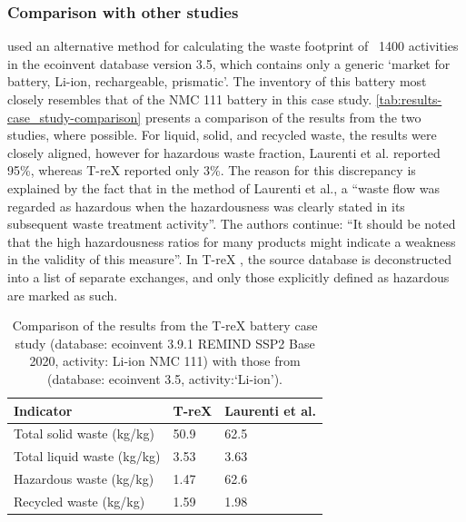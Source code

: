 \subsubsection{Comparison with other studies}\label{sec:results-case_study-comparison}

\cite{laurenti2023wastefootprint} used an alternative method for calculating the waste footprint of ~1400 activities in the ecoinvent database version 3.5, which contains only a generic `market for battery, Li-ion, rechargeable, prismatic'. The inventory of this battery most closely resembles that of the NMC 111 battery in this case study. \autoref{tab:results-case_study-comparison} presents a comparison of the results from the two studies, where possible. For liquid, solid, and recycled waste, the results were closely aligned, however for hazardous waste fraction, Laurenti et al. reported 95\%, whereas T-reX reported only 3\%. The reason for this discrepancy is explained by the fact that in the method of Laurenti et al., a ``waste flow was regarded as hazardous when the hazardousness
was clearly stated in its subsequent waste treatment activity''. The authors continue: ``It should be noted that the high hazardousness ratios for many products might indicate a weakness in the validity of this measure''. In T-reX , the source database is deconstructed into a list of separate exchanges, and only those explicitly defined as hazardous are marked as such.

\begin{table}[H]
\centering
\caption{Comparison of the results from the T-reX battery case study (database: ecoinvent 3.9.1 REMIND SSP2 Base 2020, activity: Li-ion NMC 111) with those from \cite{laurenti2023wastefootprint} (database: ecoinvent 3.5, activity:`Li-ion').}
\label{tab:results-case_study-comparison}
\begin{tabular}{lll}
\toprule
\textbf{Indicator} & \textbf{T-reX} & \textbf{Laurenti et al.} \\
\midrule
Total solid waste (kg/kg)& 50.9 & 62.5 \\
Total liquid waste (kg/kg) & 3.53 & 3.63 \\
Hazardous waste (kg/kg) & 1.47 & 62.6 \\
Recycled waste (kg/kg) & 1.59 & 1.98 \\
\bottomrule
\end{tabular}
\end{table}

